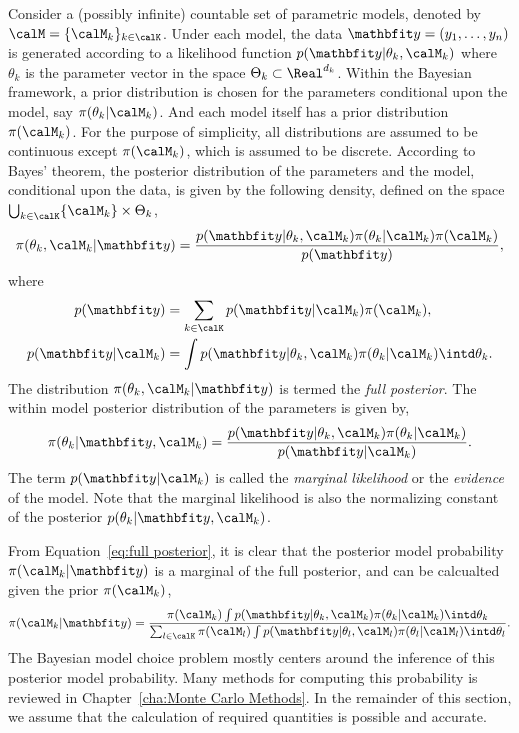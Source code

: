Consider a (possibly infinite) countable set of parametric models, denoted by
$\calM = \{\calM_k\}_{k\in\calK}$. Under each model, the data $\data =
(y_1,\dots,y_n)$ is generated according to a likelihood function
$p(\data|\theta_k,\calM_k)$ where $\theta_k$ is the parameter vector in the
space $\Theta_k\subset\Real^{d_k}$. Within the Bayesian framework, a prior
distribution is chosen for the parameters conditional upon the model, say
$\pi(\theta_k|\calM_k)$. And each model itself has a prior distribution
$\pi(\calM_k)$. For the purpose of simplicity, all distributions are assumed
to be continuous except $\pi(\calM_k)$, which is assumed to be discrete.
According to Bayes' theorem, the posterior distribution of the parameters and
the model, conditional upon the data, is given by the following density,
defined on the space $\bigcup_{k\in\calK}\{\calM_k\}\times\Theta_k$,
\begin{equation}
  \pi(\theta_k,\calM_k|\data) =
  \frac{p(\data|\theta_k,\calM_k)\pi(\theta_k|\calM_k)\pi(\calM_k)}{p(\data)},
  \label{eq:full posterior}
\end{equation}
where
\begin{align}
  p(\data) &= \sum_{k\in\calK}p(\data|\calM_k)\pi(\calM_k), \\
  p(\data|\calM_k) &=
  \int p(\data|\theta_k,\calM_k)\pi(\theta_k|\calM_k)\intd\theta_k.
  \label{eq:marginal likelihood}
\end{align}
The distribution $\pi(\theta_k,\calM_k|\data)$ is termed the \emph{full
  posterior}. The within model posterior distribution of the parameters is
given by,
\begin{equation}
  \pi(\theta_k|\data,\calM_k) =
  \frac{p(\data|\theta_k,\calM_k)\pi(\theta_k|\calM_k)}{p(\data|\calM_k)}.
  \label{eq:within posterior}
\end{equation}
The term $p(\data|\calM_k)$ is called the \emph{marginal likelihood} or the
\emph{evidence} of the model. Note that the marginal likelihood is also the
normalizing constant of the posterior $p(\theta_k|\data,\calM_k)$.

From Equation~\eqref{eq:full posterior}, it is clear that the posterior model
probability $\pi(\calM_k|\data)$ is a marginal of the full posterior, and can
be calcualted given the prior $\pi(\calM_k)$,
\begin{equation}
  \pi(\calM_k|\data) = \frac{
    \pi(\calM_k)
    \int p(\data|\theta_k,\calM_k)\pi(\theta_k|\calM_k)\intd\theta_k
  }{
    \sum_{l\in\calK}\pi(\calM_l)
    \int p(\data|\theta_l,\calM_l)\pi(\theta_l|\calM_l)\intd\theta_l
  }.
  \label{eq:post model prob}
\end{equation}
The Bayesian model choice problem mostly centers around the inference of this
posterior model probability. Many methods for computing this probability is
reviewed in Chapter~\ref{cha:Monte Carlo Methods}. In the remainder of this
section, we assume that the calculation of required quantities is possible and
accurate.

